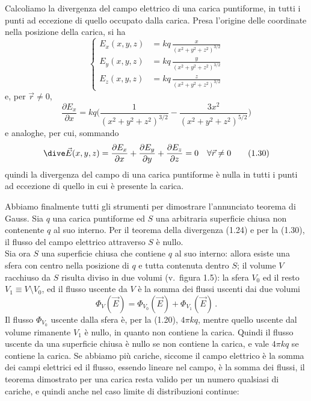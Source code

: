 Calcoliamo la divergenza del campo elettrico di una carica puntiforme, in tutti i punti ad eccezione di quello occupato dalla carica. Presa l'origine delle coordinate nella posizione della carica, si ha
\begin{equation}
\left\{\begin{aligned}
E_x(x,y,z)&=kq\,\frac{x}{(x^2+y^2+z^2)^{3/2}}\\
E_y(x,y,z)&=kq\,\frac{y}{(x^2+y^2+z^2)^{3/2}}\\
E_z(x,y,z)&=kq\,\frac{z}{(x^2+y^2+z^2)^{3/2}}
\end{aligned}\right.
\tag{1.28}
\end{equation}
e, per $\vec r\neq0$,
\begin{equation}
\frac{\partial E_x}{\partial x}=kq\Big(\frac{1}{(x^2+y^2+z^2)^{3/2}}-\frac{3x^2}{(x^2+y^2+z^2)^{5/2}}\Big)
\tag{1.29}
\end{equation}
e analoghe, per cui, sommando
\begin{equation}
\dive\vec E(x,y,z)=\frac{\partial E_x}{\partial x}+\frac{\partial E_y}{\partial y}+\frac{\partial E_z}{\partial z}=0\quad\forall\vec r\neq0
\tag{1.30}
\end{equation}
quindi la divergenza del campo di una carica puntiforme è nulla in tutti i punti ad eccezione di quello in cui è presente la carica.

Abbiamo finalmente tutti gli strumenti per dimostrare l'annunciato teorema di Gauss. Sia $q$ una carica puntiforme ed $S$ una arbitraria superficie chiusa non contenente $q$ al suo interno. Per il teorema della divergenza (1.24) e per la (1.30), il flusso del campo elettrico attraverso $S$ è nullo.\\
Sia ora $S$ una superficie chiusa che contiene $q$ al suo interno: allora esiste una sfera con centro nella posizione di $q$ e tutta contenuta dentro $S$; il volume $V$ racchiuso da $S$ risulta diviso in due volumi (v.\ figura 1.5): la sfera $V_0$ ed il resto $V_1\equiv V\setminus V_0$, ed il flusso uscente da $V$ è la somma dei flussi uscenti dai due volumi
\begin{equation}
\Phi_V(\vec E)=\Phi_{V_0}(\vec E)+\Phi_{V_1}(\vec E)\,.
\tag{1.31}
\end{equation}
Il flusso $\Phi_{V_0}$ uscente dalla sfera è, per la (1.20), $4\pi kq$, mentre quello uscente dal volume rimanente $V_1$ è nullo, in quanto non contiene la carica. Quindi il flusso uscente da una superficie chiusa è nullo se non contiene la carica, e vale $4\pi kq$ se contiene la carica. Se abbiamo più cariche, siccome il campo elettrico è la somma dei campi elettrici ed il flusso, essendo lineare nel campo, è la somma dei flussi, il teorema dimostrato per una carica resta valido per un numero qualsiasi di cariche, e quindi anche nel caso limite di distribuzioni continue:

